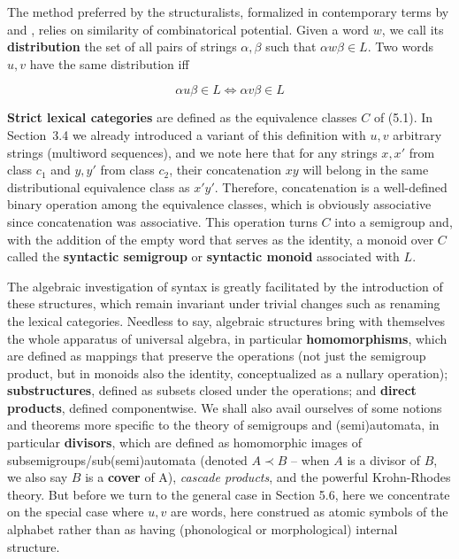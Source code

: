 \noindent 
The method preferred by the structuralists, formalized in contemporary terms
by  and , relies on similarity of
combinatorical potential. Given a word $w$, we call its {\bf distribution} the
set of all pairs of strings $\alpha,\beta$ such that $\alpha w \beta \in L$.
 Two words $u, v$ have the same distribution iff

\begin{equation}
\alpha u \beta \in L \Leftrightarrow \alpha v \beta \in L
\end{equation}

\noindent 
{\bf Strict lexical categories} are defined as the equivalence classes $C$ of
(5.1). In Section~3.4 we already introduced a variant of this definition with
$u,v$ arbitrary strings (multiword sequences), and we note here that for any
strings $x,x'$ from class $c_1$ and $y,y'$ from class $c_2$, their
concatenation $xy$ will belong in the same distributional equivalence class as
$x'y'$. Therefore, concatenation is a well-defined binary operation among the
equivalence classes, which is obviously associative since concatenation was
associative.  This operation turns $C$ into a semigroup and, with the addition
of the empty word that serves as the identity, a monoid over $C$ called the
{\bf syntactic semigroup} or {\bf syntactic monoid} associated with $L$.
  

The algebraic investigation of syntax is greatly facilitated by the
introduction of these structures, which remain invariant under trivial changes
such as renaming the lexical categories. Needless to say, algebraic structures
bring with themselves the whole apparatus of universal algebra, in particular
{\bf homomorphisms},  which are defined as mappings
that preserve the operations (not just the semigroup product, but in monoids
also the identity, conceptualized as a nullary operation); {\bf
  substructures},  defined as subsets closed under
the operations; and {\bf direct products},
defined componentwise.  We shall also avail ourselves of some notions and
theorems more specific to the theory of semigroups and (semi)automata, in
particular {\bf divisors}, which are defined as
homomorphic images of subsemigroups/sub(semi)automata (denoted $A \prec B$ --
when $A$ is a divisor of $B$, we also say $B$ is a {\bf cover} of
A), {\it cascade products}, and the powerful Krohn-Rhodes
theory. But before we turn to the general case in Section 5.6, here we
concentrate on the special case where $u,v$ are words, here construed as atomic
symbols of the alphabet rather than as having (phonological or morphological)
internal structure.

